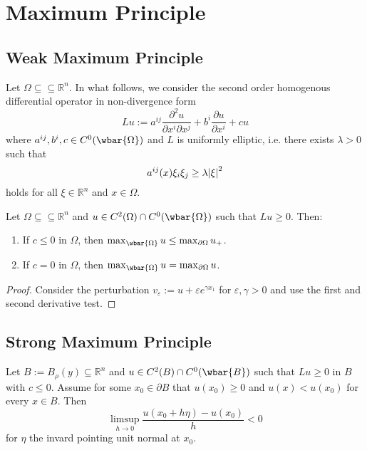 \section*{Maximum Principle}
\subsection*{Weak Maximum Principle}

Let $\Omega \subseteq \subseteq \mathbb{R}^n$. In what follows, we consider the second order homogenous differential operator in non-divergence form
\begin{equation*}
	Lu := a^{ij}\frac{\partial^2u}{\partial x^i \partial x^j} + b^i \frac{\partial u}{\partial x^i} + c u
\end{equation*}
\noindent where $a^{ij},b^i,c \in C^0(\wbar{\Omega})$ and $L$ is uniformly elliptic, i.e. there exists $\lambda > 0$ such that
\begin{equation*}
	a^{ij}(x)\xi_i\xi_j \geq \lambda \abs{\xi}^2
\end{equation*}
\noindent holds for all $\xi \in \mathbb{R}^n$ and $x \in \Omega$.

\begin{theorem}
	\label{thm:WMP}
	Let $\Omega \subseteq \subseteq \mathbb{R}^n$ and $u \in C^2(\Omega) \cap C^0(\wbar{\Omega})$ such that $Lu \geq 0$. Then:
	\begin{enumerate}[label = \textup{(}\alph*\textup{)},wide = 0pt]
		\item If $c \leq 0$ in $\Omega$, then $\max_{\wbar{\Omega}} u \leq \max_{\partial \Omega} u_+$.
		\item If $c = 0$ in $\Omega$, then $\max_{\wbar{\Omega}} u = \max_{\partial \Omega} u$.
	\end{enumerate}
\end{theorem}

\begin{proof}
	Consider the perturbation $v_\varepsilon := u + \varepsilon e^{\gamma x_1}$ for $\varepsilon,\gamma > 0$ and use the first and second derivative test.
\end{proof}

\subsection*{Strong Maximum Principle}

\begin{lemma}
	Let $B := B_\rho(y) \subseteq \mathbb{R}^n$ and $u \in C^2(B) \cap C^0(\wbar{B})$ such that $Lu \geq 0$ in $B$ with $c \leq 0$. Assume for some $x_0 \in \partial B$ that $u(x_0) \geq 0$ and $u(x) < u(x_0)$ for every $x \in B$. Then
	\begin{equation*}
		\limsup_{h \to 0} \frac{u(x_0 + h\eta) - u(x_0)}{h} < 0
	\end{equation*}
	\noindent for $\eta$ the invard pointing unit normal at $x_0$.
\end{lemma}

